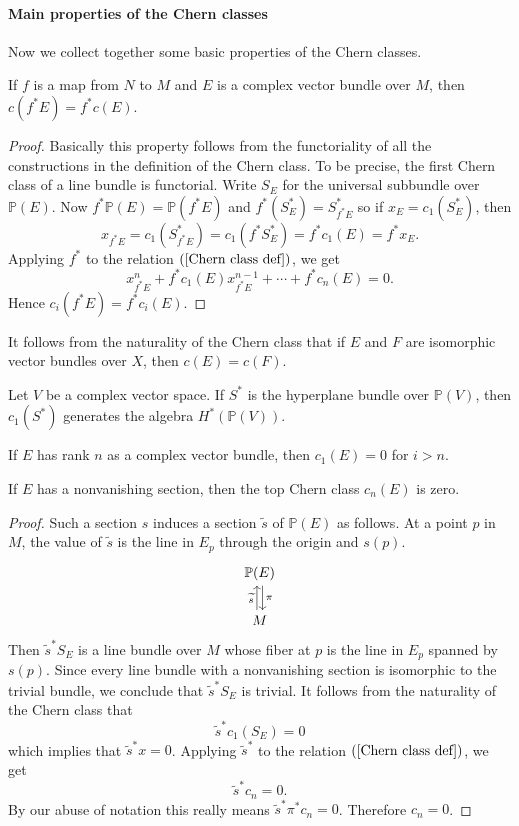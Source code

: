 \paragraph{Main properties of the Chern classes}
Now we collect together some basic properties of the Chern classes.
\begin{proposition}
If $f$ is a map from $N$ to $M$ and $E$ is a complex vector bundle over $M$, then $c(f^*E)=f^*c(E)$.
\end{proposition}
\begin{proof}
Basically this property follows from the functoriality of all the constructions in the definition of the Chern class. To be precise, the first Chern class of a line 
bundle is functorial. Write $S_E$ for the universal subbundle over $\mathbb{P}(E)$. Now $f^*\mathbb{P}(E)=\mathbb{P}(f^*E)$ and $f^*(S_E^*)=S^*_{f^*E}$ so if 
$x_E=c_1(S^*_E)$, then
\[x_{f^*E}=c_1(S^*_{f^*E})=c_1(f^*S^*_E)=f^*c_1(E)=f^*x_E.\]
Applying $f^*$ to the relation $(\ref{Chern class def})$, we get
\[x^n_{f^*E}+f^*c_1(E)x^{n-1}_{f^*E}+\cdots+f^*c_n(E)=0.\]
Hence $c_i(f^*E)=f^*c_i(E)$.
\end{proof}
It follows from the naturality of the Chern class that if $E$ and $F$ are isomorphic vector bundles over $X$, then $c(E)=c(F)$.
\begin{proposition}
Let $V$ be a complex vector space. If $S^*$ is the hyperplane bundle over $\mathbb{P}(V)$, then $c_1(S^*)$ generates the algebra $H^*(\mathbb{P}(V))$.
\end{proposition}
\begin{proposition}
If $E$ has rank $n$ as a complex vector bundle, then $c_1(E)=0$ for $i>n$.
\end{proposition}
\begin{proposition}
If $E$ has a nonvanishing section, then the top Chern class $c_n(E)$ is zero.
\end{proposition}
\begin{proof}
Such a section $s$ induces a section $\widetilde{s}$ of $\mathbb{P}(E)$ as follows. At a point $p$ in $M$, the value of $\widetilde{s}$ is the line in $E_p$ through the 
origin and $s(p)$.
\[\begin{tikzcd}
\mathbb{P}(E)\ar[d,shift left=0.2em,"\pi"]\\
M\ar[u,shift left=0.2em,"\widetilde{s}"]
\end{tikzcd}\]
Then $\widetilde{s}^*S_E$ is a line bundle over $M$ whose fiber at $p$ is the line in $E_p$ spanned by $s(p)$. Since every line bundle with a nonvanishing section is
isomorphic to the trivial bundle, we conclude that $\widetilde{s}^*S_E$ is trivial. It follows from the naturality of the Chern class that
\[\widetilde{s}^*c_1(S_E)=0\]
which implies that $\widetilde{s}^*x=0$. Applying $\widetilde{s}^*$ to the relation $(\ref{Chern class def})$, we get
\[\widetilde{s}^*c_n=0.\]
By our abuse of notation this really means $\widetilde{s}^*\pi^*c_n=0$. Therefore $c_n=0$.
\end{proof}
